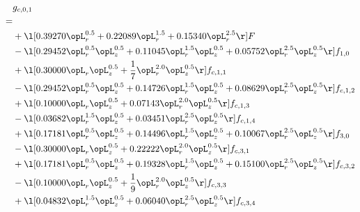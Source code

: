 \begin{alignat}{2} 
\label{eq:g_01_0} 
& g_{c,0,1} \nonumber \\ 
 = \\ 
& + \l[  0.39270 \opL_r^{0.5} +  0.22089 \opL_r^{1.5} +  0.15340 \opL_r^{2.5}  \r] F \nonumber \\ 
& - \l[  0.29452 \opL_r^{0.5} \opL_z^{0.5} +  0.11045 \opL_r^{1.5} \opL_z^{0.5} +  0.05752 \opL_r^{2.5} \opL_z^{0.5}  \r] f_{1,0} \nonumber \\ 
& + \l[  0.30000 \opL_r \opL_z^{0.5} + \frac{1}{7} \opL_r^{2.0} \opL_z^{0.5}  \r] f_{c,1,1} \nonumber \\ 
& - \l[  0.29452 \opL_r^{0.5} \opL_z^{0.5} +  0.14726 \opL_r^{1.5} \opL_z^{0.5} +  0.08629 \opL_r^{2.5} \opL_z^{0.5}  \r] f_{c,1,2} \nonumber \\ 
& + \l[  0.10000 \opL_r \opL_z^{0.5} +  0.07143 \opL_r^{2.0} \opL_z^{0.5}  \r] f_{c,1,3} \nonumber \\ 
& - \l[  0.03682 \opL_r^{1.5} \opL_z^{0.5} +  0.03451 \opL_r^{2.5} \opL_z^{0.5}  \r] f_{c,1,4} \nonumber \\ 
& + \l[  0.17181 \opL_r^{0.5} \opL_z^{0.5} +  0.14496 \opL_r^{1.5} \opL_z^{0.5} +  0.10067 \opL_r^{2.5} \opL_z^{0.5}  \r] f_{3,0} \nonumber \\ 
& - \l[  0.30000 \opL_r \opL_z^{0.5} +  0.22222 \opL_r^{2.0} \opL_z^{0.5}  \r] f_{c,3,1} \nonumber \\ 
& + \l[  0.17181 \opL_r^{0.5} \opL_z^{0.5} +  0.19328 \opL_r^{1.5} \opL_z^{0.5} +  0.15100 \opL_r^{2.5} \opL_z^{0.5}  \r] f_{c,3,2} \nonumber \\ 
& - \l[  0.10000 \opL_r \opL_z^{0.5} + \frac{1}{9} \opL_r^{2.0} \opL_z^{0.5}  \r] f_{c,3,3} \nonumber \\ 
& + \l[  0.04832 \opL_r^{1.5} \opL_z^{0.5} +  0.06040 \opL_r^{2.5} \opL_z^{0.5}  \r] f_{c,3,4} \nonumber \\ 
\end{alignat} 


